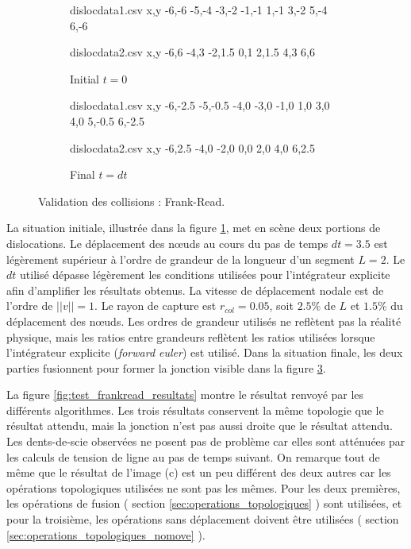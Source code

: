 \documentclass[11pt,class=article,float=false,crop=false]{standalone}
\begin{document}
\begin{figure}[H]
	\centering
	\begin{subfigure}[b]{0.5\textwidth}
		\centering
		\begin{filecontents*}{dislocdata1.csv}
			x,y
			-6,-6
			-5,-4
			-3,-2
			-1,-1
			1,-1
			3,-2
			5,-4
			6,-6
		\end{filecontents*}
		\begin{filecontents*}{dislocdata2.csv}
			x,y
			-6,6
			-4,3
			-2,1.5
			0,1
			2,1.5
			4,3
			6,6
		\end{filecontents*}
		\caption{Initial $t=0$}
		\label{fig:test_frankread_initial}
	\end{subfigure}%
	\begin{subfigure}[b]{0.5\textwidth}
		\centering
		\begin{filecontents*}{dislocdata1.csv}
			x,y
			-6,-2.5
			-5,-0.5
			-4,0
			-3,0
			-1,0
			 1,0
			 3,0
			 4,0
			 5,-0.5
			 6,-2.5
		\end{filecontents*}
		\begin{filecontents*}{dislocdata2.csv}
			x,y
			-6,2.5
			-4,0
			-2,0
			 0,0
			 2,0
			 4,0
			 6,2.5
		\end{filecontents*}
		\caption{Final $t=dt$}
		\label{fig:test_frankread_final}
	\end{subfigure}
	\caption{Validation des collisions : Frank-Read.}
\end{figure}

La situation initiale, illustrée dans la figure \ref{fig:test_frankread_initial}, met en scène deux portions de dislocations. Le déplacement des nœuds au cours du pas de temps $dt=3.5$ est légèrement supérieur à l'ordre de grandeur de la longueur d'un segment $L=2$. Le $dt$ utilisé dépasse légèrement les conditions utilisées pour l'intégrateur explicite afin d'amplifier les résultats obtenus. La vitesse de déplacement nodale est de l'ordre de $||v||=1$. Le rayon de capture est $r_{col} = 0.05$, soit $2.5\%$ de $L$ et $1.5\%$ du déplacement des nœuds. Les ordres de grandeur utilisés ne reflètent pas la réalité physique, mais les ratios entre grandeurs reflètent les ratios utilisées lorsque l'intégrateur explicite (\textit{forward euler}) est utilisé. Dans la situation finale, les deux parties fusionnent pour former la jonction visible dans la figure \ref{fig:test_frankread_final}.

La figure \ref{fig:test_frankread_resultats} montre le résultat renvoyé par les différents algorithmes. Les trois résultats conservent la même topologie que le résultat attendu, mais la jonction n'est pas aussi droite que le résultat attendu. Les dents-de-scie observées ne posent pas de problème car elles sont atténuées par les calculs de tension de ligne au pas de temps suivant. On remarque tout de même que le résultat de l'image (c) est un peu différent des deux autres car les opérations topologiques utilisées ne sont pas les mêmes. Pour les deux premières, les opérations de fusion ( section \ref{sec:operations_topologiques} ) sont utilisées, et pour la troisième, les opérations sans déplacement doivent être utilisées ( section \ref{sec:operations_topologiques_nomove} ). 
\end{document}
